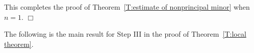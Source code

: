 \documentclass[12pt]{amsart}
\newcommand{\liang}[1]{{\color{blue} \sf $\clubsuit\clubsuit\clubsuit$ Liang: [#1]}}
\theoremstyle{definition}
\newtheorem{remark}[subsection]{Remark}
\numberwithin{equation}{subsection}
\def\bfe{\mathbf{e}}
\newcommand{\new}{\mathrm{new}}
\begin{document}
This completes the proof of Theorem~\ref{T:estimate of nonprincipal minor} when $n=1$.
\hfill $\Box$


\medskip
The following is the main result for Step III in the proof of Theorem~\ref{T:local theorem}.
\end{document}
